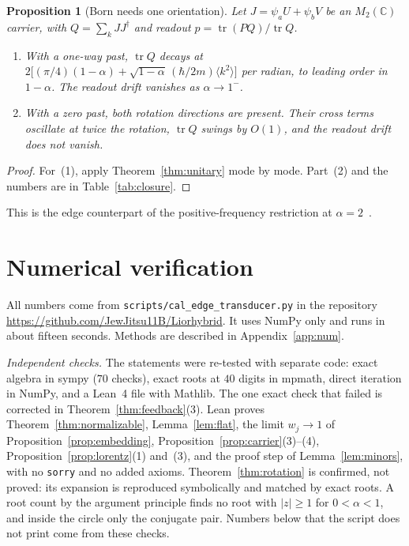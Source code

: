 \documentclass[11pt]{amsart}
\newtheorem{proposition}[theorem]{Proposition}
\theoremstyle{definition}
\theoremstyle{remark}
\newcommand{\tr}{\operatorname{tr}}
\begin{document}
\begin{proposition}[Born needs one orientation]\label{prop:born}
Let $J=\psi_aU+\psi_bV$ be an $M_2(\mathbb C)$ carrier, with $Q=\sum_kJJ^\dagger$ and readout $p=\tr(PQ)/\tr Q$.
\begin{enumerate}
\item With a one-way past, $\tr Q$ decays at $2\big[(\pi/4)(1-\alpha)+\sqrt{1-\alpha}\,(\hbar/2m)\langle k^2\rangle\big]$ per radian, to leading order in $1-\alpha$. The readout drift vanishes as $\alpha\to1^-$.
\item With a zero past, both rotation directions are present. Their cross terms oscillate at twice the rotation, $\tr Q$ swings by $O(1)$, and the readout drift does not vanish.
\end{enumerate}
\end{proposition}

\begin{proof}
For~(1), apply Theorem~\ref{thm:unitary} mode by mode. Part~(2) and the numbers are in Table~\ref{tab:closure}. \end{proof}

This is the edge counterpart of the positive-frequency restriction at $\alpha=2$~\cite{Alpha2}.

\section{Numerical verification}\label{sec:num}

All numbers come from \texttt{scripts/cal\_edge\_transducer.py} in the repository \url{https://github.com/JewJitsu11B/Liorhybrid}. It uses NumPy only and runs in about fifteen seconds. Methods are described in Appendix~\ref{app:num}.

\emph{Independent checks.} The statements were re-tested with separate code: exact algebra in sympy ($70$ checks), exact roots at $40$ digits in mpmath, direct iteration in NumPy, and a Lean~4 file with Mathlib. The one exact check that failed is corrected in Theorem~\ref{thm:feedback}(3). Lean proves Theorem~\ref{thm:normalizable}, Lemma~\ref{lem:flat}, the limit $w_j\to1$ of Proposition~\ref{prop:embedding}, Proposition~\ref{prop:carrier}(3)--(4), Proposition~\ref{prop:lorentz}(1) and~(3), and the proof step of Lemma~\ref{lem:minors}, with no \texttt{sorry} and no added axioms. Theorem~\ref{thm:rotation} is confirmed, not proved: its expansion is reproduced symbolically and matched by exact roots. A root count by the argument principle finds no root with $\lvert z\rvert\ge1$ for $0<\alpha<1$, and inside the circle only the conjugate pair. Numbers below that the script does not print come from these checks.
\end{document}
